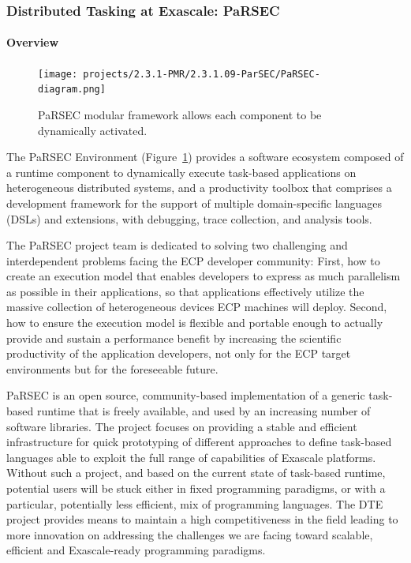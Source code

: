 \subsubsection{ Distributed Tasking at Exascale: PaRSEC}


\paragraph{Overview}

\begin{figure}
\centering
\texttt{[image: projects/2.3.1-PMR/2.3.1.09-ParSEC/PaRSEC-diagram.png]}
\caption{PaRSEC modular framework allows each component to be dynamically activated.}
\label{fig:parsec}
\end{figure}

The PaRSEC Environment (Figure~\ref{fig:parsec}) provides a software ecosystem composed of a runtime
component to dynamically execute task-based applications on heterogeneous
distributed systems, and a productivity toolbox that comprises a development framework for the support of multiple domain-specific languages (DSLs) and extensions, with debugging, trace collection, and analysis tools.

The PaRSEC project team is dedicated to solving two challenging and
interdependent problems facing the ECP developer community: First, how to create an execution model that enables developers to express as much parallelism as possible in their applications, so that applications effectively utilize the massive collection of heterogeneous devices ECP machines will deploy. Second, how to ensure the execution model is flexible and portable enough to actually provide and sustain a performance benefit by increasing the scientific productivity of the application developers, not only for the ECP target environments but for the foreseeable future.


PaRSEC is an open source, community-based implementation of a generic task-based
runtime that is freely available, and used by an increasing number of software
libraries.
The project focuses on providing a stable and efficient infrastructure for quick
prototyping of different approaches to define task-based languages able to
exploit the full range of capabilities of Exascale platforms. Without such a
project, and based on the current state of task-based runtime, potential users
will be stuck either in fixed programming paradigms, or with a particular,
potentially less efficient, mix of programming languages. The DTE project
provides means to maintain a high competitiveness in the field leading to more
innovation on addressing the challenges we are facing toward scalable,
efficient and Exascale-ready programming paradigms.

